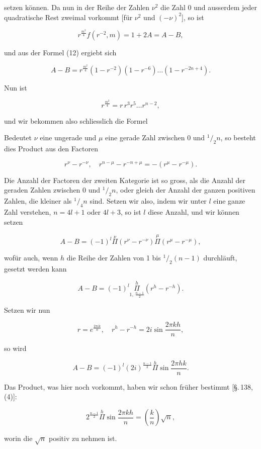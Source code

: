 
setzen können. Da nun in der Reihe der Zahlen $\nu^2$ die Zahl 0
und ausserdem jeder quadratische Rest zweimal vorkommt [für
$\nu^2$ und $(-\nu)^2$], so ist

\[ r^{\frac{m^2}{4}} f(r^{-2}, m) = 1 + 2A = A - B, \]

und aus der Formel (12) ergiebt sich

\[ A - B = r^{\frac{m^2}{4}} (1 - r^{-2})(1 - r^{-6}) \ldots (1 - r^{-2n + 4}). \]

Nun ist

\[ r^{\frac{m^2}{4}} = r\, r^3 r^5 \ldots r^{n - 2}, \]

und wir bekommen also schliesslich die Formel


Bedeutet $\nu$ eine ungerade und $\mu$ eine gerade Zahl zwischen
0 und ${}^1/_2 n$, so besteht dies Product aus den Factoren

\[ r^{\nu} - r^{-\nu}, \quad r^{n - \mu} - r^{-n + \mu} = -(r^{\mu} - r^{-\mu}). \]

Die Anzahl der Factoren der zweiten Kategorie ist so gross,
als die Anzahl der geraden Zahlen zwischen 0 und ${}^1/_2 n$, oder
gleich der Anzahl der ganzen positiven Zahlen, die kleiner als
${}^1/_4 n$ sind. Setzen wir also, indem wir unter $l$ eine ganze Zahl
verstehen, $n = 4l + 1$ oder $4l + 3$, so ist $l$ diese Anzahl, und
wir können setzen

\[ A - B = (-1)^{l} \overset{\nu}{\Pi} (r^{\nu} - r^{-\nu}) \overset{\mu}{\Pi} (r^{\mu} - r^{-\mu}), \]

wofür auch, wenn $h$ die Reihe der Zahlen von 1 bis ${}^1/_2 (n - 1)$
durchläuft, gesetzt werden kann

\[ A - B = (-1)^{l} \overset{h}{\underset{1,\, \frac{n - 1}{2}}{\Pi}} (r^{h} - r^{-h}). \]

Setzen wir nun

\[ r = e^{\frac{2 \pi i k}{n}}, \quad r^{h} - r^{-h} = 2i \sin \frac{2 \pi k h}{n}, \]

so wird

\[ A - B = (-1)^{l} (2i)^{\frac{n - 1}{2}} \overset{h}{\Pi} \sin \frac{2 \pi h k}{n}. \]

Das Product, was hier noch vorkommt, haben wir schon
früher bestimmt [\S.\,138, (4)]:

\[ 2^{\frac{n - 1}{2}} \overset{h}{\Pi} \sin \frac{2 \pi k h}{n} = \left( \frac{k}{n} \right) \sqrt{n}, \]

worin die $\sqrt{n}$ positiv zu nehmen ist.
